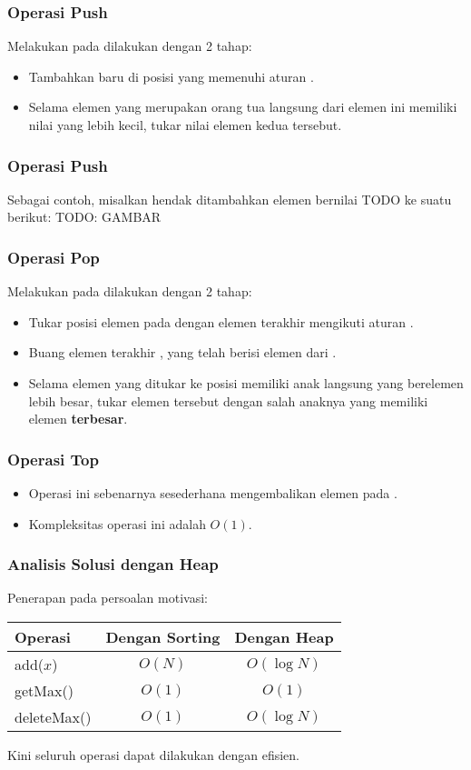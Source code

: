 \begin{frame}
\frametitle{Operasi Push}
Melakukan  pada \pbinaryHeap dilakukan dengan 2 tahap:
\begin{itemize}
  \item Tambahkan \fnode baru di posisi yang memenuhi aturan .
  \item Selama elemen \fnode yang merupakan orang tua langsung dari elemen ini memiliki nilai yang lebih kecil, tukar nilai elemen kedua \fnode tersebut.
\end{itemize}
\end{frame}

\begin{frame}
\frametitle{Operasi Push}
Sebagai contoh, misalkan hendak ditambahkan elemen bernilai TODO ke suatu \pbinaryHeap berikut:
TODO: GAMBAR
\end{frame}

\begin{frame}
\frametitle{Operasi Pop}
Melakukan  pada \pbinaryHeap dilakukan dengan 2 tahap:
\begin{itemize}
  \item Tukar posisi elemen pada  dengan elemen terakhir mengikuti aturan .
  \item Buang elemen terakhir \pbinaryHeap, yang telah berisi elemen dari .
  \item Selama elemen yang ditukar ke posisi  memiliki anak langsung yang berelemen lebih besar, tukar elemen tersebut dengan salah anaknya yang memiliki elemen \textbf{terbesar}. 
\end{itemize}
\end{frame}


\begin{frame}
\frametitle{Operasi Top}
\begin{itemize}
  \item Operasi ini sebenarnya sesederhana mengembalikan elemen pada  \pbinaryHeap.
  \item Kompleksitas operasi ini adalah $O(1)$.
\end{itemize}
\end{frame}

\begin{frame}
\frametitle{Analisis Solusi dengan Heap}
Penerapan \pheap pada persoalan motivasi:
\begin{table}[ht]
  \begin{tabular}{|l|c|c|}
    \hline Operasi  & Dengan Sorting & Dengan Heap \\
    \hline  add($x$) & $O(N)$ & $O(\log{N})$\\
    \hline  getMax() & $O(1)$ & $O(1)$\\
    \hline  deleteMax() & $O(1)$ & $O(\log{N})$\\
    \hline
  \end{tabular}
\end{table}  

Kini seluruh operasi dapat dilakukan dengan efisien.
\end{frame}

